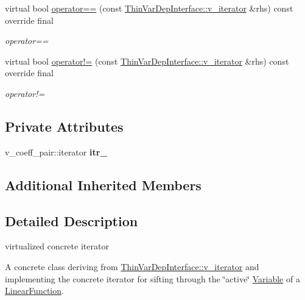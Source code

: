 \begin{DoxyCompactItemize}
virtual bool \mbox{\hyperlink{class_s_m_spp__di__unipi__it_1_1_linear_function_1_1v__iterator_a0dc0c588cd40c35cea17618336da30c3}{operator==}} (const \mbox{\hyperlink{class_s_m_spp__di__unipi__it_1_1_thin_var_dep_interface_1_1v__iterator}{Thin\+Var\+Dep\+Interface\+::v\+\_\+iterator}} \&rhs) const override final
\begin{DoxyCompactList}\small\item\em operator== \end{DoxyCompactList}\item 
\mbox{\label{class_s_m_spp__di__unipi__it_1_1_linear_function_1_1v__iterator_a4ef887954a2c32df7152f23942ff2882}} 
virtual bool \mbox{\hyperlink{class_s_m_spp__di__unipi__it_1_1_linear_function_1_1v__iterator_a4ef887954a2c32df7152f23942ff2882}{operator!=}} (const \mbox{\hyperlink{class_s_m_spp__di__unipi__it_1_1_thin_var_dep_interface_1_1v__iterator}{Thin\+Var\+Dep\+Interface\+::v\+\_\+iterator}} \&rhs) const override final
\begin{DoxyCompactList}\small\item\em operator!= \end{DoxyCompactList}\end{DoxyCompactItemize}
\subsection*{Private Attributes}
\begin{DoxyCompactItemize}
\item 
\mbox{\label{class_s_m_spp__di__unipi__it_1_1_linear_function_1_1v__iterator_acb9888c392fe55655625c3e6e170cfb5}} 
v\+\_\+coeff\+\_\+pair\+::iterator {\bfseries itr\+\_\+}
\end{DoxyCompactItemize}
\subsection*{Additional Inherited Members}


\subsection{Detailed Description}
virtualized concrete iterator 

A concrete class deriving from \mbox{\hyperlink{class_s_m_spp__di__unipi__it_1_1_thin_var_dep_interface_1_1v__iterator}{Thin\+Var\+Dep\+Interface\+::v\+\_\+iterator}} and implementing the concrete iterator for sifting through the \char`\"{}active\char`\"{} \mbox{\hyperlink{class_s_m_spp__di__unipi__it_1_1_variable}{Variable}} of a \mbox{\hyperlink{class_s_m_spp__di__unipi__it_1_1_linear_function}{Linear\+Function}}. 

